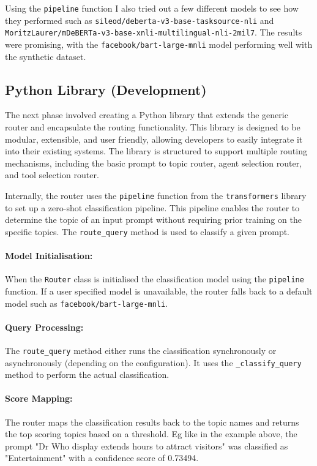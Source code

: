 Using the \texttt{pipeline} function I also tried out a few different models to see how they performed such as \texttt{sileod/deberta-v3-base-tasksource-nli} and \texttt{MoritzLaurer/mDeBERTa-v3-base-xnli-multilingual-nli-2mil7}. The results were promising, with the \texttt{facebook/bart-large-mnli} model performing well with the synthetic dataset.


\subsection{Python Library
(Development)}\label{python library development}



The next phase involved creating a Python library that extends the generic router and encapsulate the routing functionality. This library is designed to be modular, extensible, and user friendly, allowing developers to easily integrate
it into their existing systems. The library is structured to support
multiple routing mechanisms, including the basic prompt to topic router,
agent selection router, and tool selection router.


Internally, the router uses the \texttt{pipeline} function from the \texttt{transformers} library to set up a zero-shot classification pipeline. This pipeline enables the router to determine the topic of an input prompt without requiring prior training on the specific topics. The \texttt{route\_query} method is used to classify a given prompt.

\paragraph{Model Initialisation:} When the \texttt{Router} class is initialised the classification model using the \texttt{pipeline} function. If a user specified model is unavailable, the router falls back to a default model such as \texttt{facebook/bart-large-mnli}.

\paragraph{Query Processing:} The \texttt{route\_query} method either runs the classification synchronously or asynchronously (depending on the configuration). It uses the \texttt{\_classify\_query} method to perform the actual classification.

\paragraph{Score Mapping:} The router maps the classification results back to the topic names and returns the top scoring topics based on a threshold. Eg like in the example above, the prompt "Dr Who display extends hours to attract visitors" was classified as "Entertainment" with a confidence score of 0.73494.

